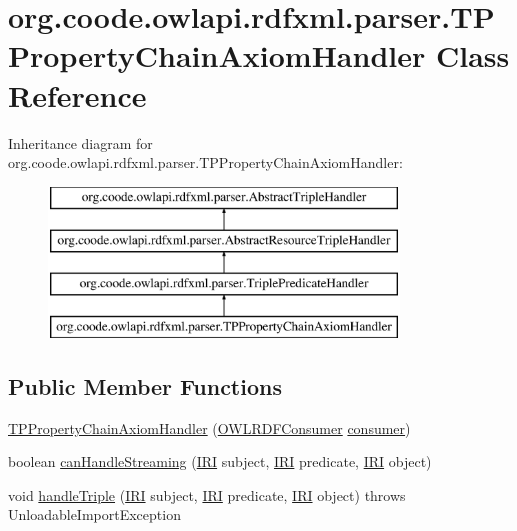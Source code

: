 \hypertarget{classorg_1_1coode_1_1owlapi_1_1rdfxml_1_1parser_1_1_t_p_property_chain_axiom_handler}{\section{org.\-coode.\-owlapi.\-rdfxml.\-parser.\-T\-P\-Property\-Chain\-Axiom\-Handler Class Reference}
\label{classorg_1_1coode_1_1owlapi_1_1rdfxml_1_1parser_1_1_t_p_property_chain_axiom_handler}
}
Inheritance diagram for org.\-coode.\-owlapi.\-rdfxml.\-parser.\-T\-P\-Property\-Chain\-Axiom\-Handler\-:\begin{figure}[H]
\begin{center}
\leavevmode
\includegraphics[height=4.000000cm]{classorg_1_1coode_1_1owlapi_1_1rdfxml_1_1parser_1_1_t_p_property_chain_axiom_handler}
\end{center}
\end{figure}
\subsection*{Public Member Functions}
\begin{DoxyCompactItemize}
\item 
\hyperlink{classorg_1_1coode_1_1owlapi_1_1rdfxml_1_1parser_1_1_t_p_property_chain_axiom_handler_ab805e823b368da6703a165c4f356dc52}{T\-P\-Property\-Chain\-Axiom\-Handler} (\hyperlink{classorg_1_1coode_1_1owlapi_1_1rdfxml_1_1parser_1_1_o_w_l_r_d_f_consumer}{O\-W\-L\-R\-D\-F\-Consumer} \hyperlink{classorg_1_1coode_1_1owlapi_1_1rdfxml_1_1parser_1_1_abstract_triple_handler_a4ccf4d898ff01eb1cadfa04b23d54e9c}{consumer})
\item 
boolean \hyperlink{classorg_1_1coode_1_1owlapi_1_1rdfxml_1_1parser_1_1_t_p_property_chain_axiom_handler_ae335f54496e427a290d499df5bf0664c}{can\-Handle\-Streaming} (\hyperlink{classorg_1_1semanticweb_1_1owlapi_1_1model_1_1_i_r_i}{I\-R\-I} subject, \hyperlink{classorg_1_1semanticweb_1_1owlapi_1_1model_1_1_i_r_i}{I\-R\-I} predicate, \hyperlink{classorg_1_1semanticweb_1_1owlapi_1_1model_1_1_i_r_i}{I\-R\-I} object)
\item 
void \hyperlink{classorg_1_1coode_1_1owlapi_1_1rdfxml_1_1parser_1_1_t_p_property_chain_axiom_handler_a3b713b177831d69c1fbfc253c0364422}{handle\-Triple} (\hyperlink{classorg_1_1semanticweb_1_1owlapi_1_1model_1_1_i_r_i}{I\-R\-I} subject, \hyperlink{classorg_1_1semanticweb_1_1owlapi_1_1model_1_1_i_r_i}{I\-R\-I} predicate, \hyperlink{classorg_1_1semanticweb_1_1owlapi_1_1model_1_1_i_r_i}{I\-R\-I} object)  throws Unloadable\-Import\-Exception 
\end{DoxyCompactItemize}
